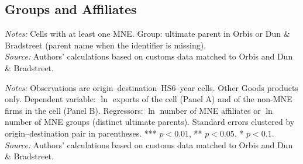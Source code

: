 \documentclass[11pt,a4paper]{article}
\begin{document}
\subsection{Groups and Affiliates}
\begin{table}[H]\centering\small%
  \caption{Other Goods: Multinational Affiliates and Groups in Origin--Destination--Product--Year Cells}%
  \label{tab:grp_rest}%
  \par\vspace{3pt}%
  \begin{minipage}{0.95\textwidth}\footnotesize %
  \textit{Notes:} Cells with at least one MNE. Group: ultimate parent in Orbis or Dun \& Bradstreet (parent name when the identifier is missing).\\[3pt]%
  \textit{Source:} Authors' calculations based on customs data matched to Orbis and Dun \& Bradstreet.%
  \end{minipage}%
  \end{table}
\begin{table}[H]\centering\small%
  \caption{Other Goods: Multinational Presence and Exports: Affiliates and Groups}%
  \label{tab:grp_r_rest}%
  \par\vspace{3pt}%
  \begin{minipage}{0.95\textwidth}\footnotesize %
  \textit{Notes:} Observations are origin--destination--HS6--year cells. Other Goods products only. Dependent variable: $\ln$ exports of the cell (Panel A) and of the non-MNE firms in the cell (Panel B). Regressors: $\ln$ number of MNE affiliates or $\ln$ number of MNE groups (distinct ultimate parents). Standard errors clustered by origin--destination pair in parentheses. *** $p<0.01$, ** $p<0.05$, * $p<0.1$.\\[3pt]%
  \textit{Source:} Authors' calculations based on customs data matched to Orbis and Dun \& Bradstreet.%
  \end{minipage}%
  \end{table}
\end{document}
